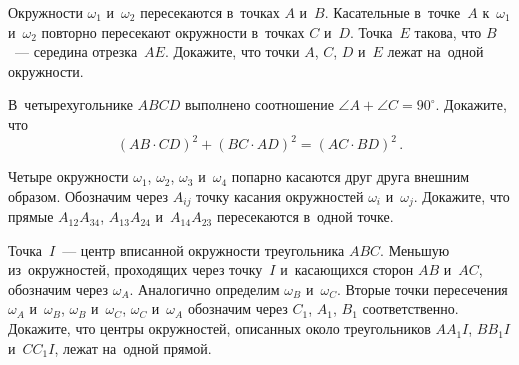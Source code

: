 \begin{problems}
\item
Окружности $\omega_{1}$ и~$\omega_{2}$ пересекаются в~точках $A$ и~$B$.
Касательные в~точке~$A$ к~$\omega_{1}$ и~$\omega_{2}$ повторно пересекают
окружности в~точках $C$ и~$D$.
Точка~$E$ такова, что $B$~--- середина отрезка~$AE$.
Докажите, что точки $A$, $C$, $D$ и~$E$ лежат на~одной окружности.

\item
В~четырехугольнике $ABCD$ выполнено соотношение
$\angle A + \angle C = 90^{\circ}$.
Докажите, что
\[
    (AB \cdot CD)^2 + (BC \cdot AD)^2 = (AC \cdot BD)^2
\, . \]

\item
Четыре окружности $\omega_{1}$, $\omega_{2}$, $\omega_{3}$ и~$\omega_{4}$
попарно касаются друг друга внешним образом.
Обозначим через $A_{ij}$ точку касания окружностей $\omega_{i}$ и~$\omega_{j}$.
Докажите, что прямые $A_{12}A_{34}$, $A_{13}A_{24}$ и~$A_{14}A_{23}$
пересекаются в~одной точке.

\item
Точка~$I$~--- центр вписанной окружности треугольника $ABC$.
Меньшую из~окружностей, проходящих через точку~$I$ и~касающихся
сторон $AB$ и~$AC$, обозначим через $\omega_{A}$.
Аналогично определим $\omega_{B}$ и~$\omega_{C}$.
Вторые точки пересечения
$\omega_{A}$ и~$\omega_{B}$,
$\omega_{B}$ и~$\omega_{C}$,
$\omega_{C}$ и~$\omega_{A}$
обозначим через $C_{1}$, $A_{1}$, $B_{1}$ соответственно.
Докажите, что центры окружностей, описанных около
треугольников $AA_{1}I$, $BB_{1}I$ и~$CC_{1}I$, лежат на~одной прямой.

\end{problems}

